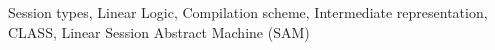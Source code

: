 \acresetall
\noindent Session types, Linear Logic, Compilation scheme, Intermediate representation, CLASS, Linear Session Abstract Machine (SAM)